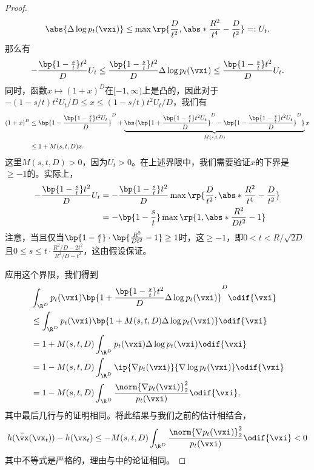 \documentclass[../../book-main_zh.tex]{subfiles}
\begin{document}
\begin{proof}
\begin{equation}
        \abs{\Delta \log p_{t}(\vxi)} \leq \max\rp{\frac{D}{t^{2}},
        \abs*{\frac{R^{2}}{t^{4}} - \frac{D}{t^{2}}}} =: U_{t}.
    \end{equation}
    那么有
    \begin{equation}
        -\frac{\bp{1 - \frac{s}{t}}t^{2}}{D}U_{t} \leq \frac{\bp{1 -
        \frac{s}{t}}t^{2}}{D}\Delta \log p_{t}(\vxi) \leq \frac{\bp{1
        - \frac{s}{t}}t^{2}}{D}U_{t}.
    \end{equation}
    同时，函数\(x \mapsto (1 + x)^{D}\)在\([-1, \infty)\)上是凸的，因此对于\(-(1-s/t)t^{2}U_{t}/D \leq x \leq (1-s/t)t^{2}U_{t}/D\)，我们有
    \begin{align}
        (1 + x)^{D}
        &\leq \bp{1 - \frac{\bp{1 - \frac{s}{t}}t^{2}U_{t}}{D}}^{D} +
        \underbrace{\bs{\bp{1 + \frac{\bp{1 -
                \frac{s}{t}}t^{2}U_{t}}{D}}^{D} - \bp{1 - \frac{\bp{1 -
        \frac{s}{t}}t^{2}U_{t}}{D}}^{D}}}_{M(s, t, D)}x \\
        &\leq 1 + M(s, t, D)x.
    \end{align}
    这里\(M(s, t, D) > 0\)，因为\(U_{t} > 0\)。在上述界限中，我们需要验证\(x\)的下界是\(\geq -1\)的。实际上，
    \begin{align}
        -\frac{\bp{1 - \frac{s}{t}}t^{2}}{D}U_{t}
        &= -\frac{\bp{1 -
        \frac{s}{t}}t^{2}}{D}\max\rp{\frac{D}{t^{2}},
        \abs*{\frac{R^{2}}{t^{4}} - \frac{D}{t^{2}}}} \\
        &= -\bp{1 - \frac{s}{t}}\max\rp{1, \abs*{\frac{R^{2}}{Dt^{2}} - 1}}
    \end{align}
    注意，当且仅当\(\bp{1 - \frac{s}{t}}\cdot\bp{\frac{R^{2}}{Dt^{2}} - 1} \geq 1\)时，这\(\geq -1\)，即\(0 < t < R/\sqrt{2D}\)且\(0 \leq s \leq t\cdot\frac{R^{2}/D - 2t^{2}}{R^{2}/D - t^{2}}\)，这由假设保证。

    应用这个界限，我们得到
    \begin{align}
        &\int_{\R^{D}} p_{t}(\vxi)\bp{1 + \frac{\bp{1 -
        \frac{s}{t}}t^{2}}{D}\Delta \log p_{t}(\vxi)}^{D}\odif{\vxi} \\
        &\leq \int_{\R^{D}}p_{t}(\vxi)\bp{1 + M(s, t, D)\Delta \log
        p_{t}(\vxi)}\odif{\vxi} \\
        &= 1 + M(s, t, D)\int_{\R^{D}}p_{t}(\vxi)\Delta \log
        p_{t}(\vxi)\odif{\vxi} \\
        &= 1 - M(s, t, D)\int_{\R^{D}}\ip{\nabla
        p_{t}(\vxi)}{\nabla\log p_{t}(\vxi)}\odif{\vxi} \\
        &= 1 - M(s, t, D)\int_{\R^{D}}\frac{\norm{\nabla
        p_{t}(\vxi)}_{2}^{2}}{p_{t}(\vxi)}\odif{\vxi},
    \end{align}
    其中最后几行与的证明相同。将此结果与我们之前的估计相结合，
    \begin{equation}
        h(\bar{\vx}(\vx_{t})) - h(\vx_{t}) \leq - M(s, t,
        D)\int_{\R^{D}}\frac{\norm{\nabla
        p_{t}(\vxi)}_{2}^{2}}{p_{t}(\vxi)}\odif{\vxi} < 0
    \end{equation}
    其中不等式是严格的，理由与中的论证相同。
\end{proof}
\end{document}
